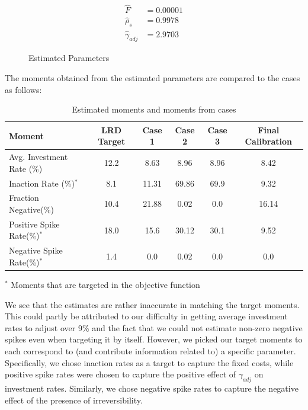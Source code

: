 \begin{figure}[H]
    \begin{align}
        \hat{F} &= 0.00001 \\
        \hat{\rho}_s &= 0.9978 \\
        \hat{\gamma}_{adj} &= 2.9703
    \end{align}
    \caption{Estimated Parameters}
\end{figure}
\noindent The moments obtained from the estimated parameters are compared to the cases as follows:
\begin{table}[H]
    \begin{tabular}{l c c c c c}
        
            \toprule
            Moment & LRD Target & Case 1 & Case 2 & Case 3 & Final Calibration \\
            \midrule
            Avg. Investment Rate (\%) & 12.2 & 8.63 & 8.96 & 8.96 & 8.42\\
            Inaction Rate (\%)$^*$ & 8.1 & 11.31 & 69.86 & 69.9 & 9.32 \\
            Fraction Negative(\%) & 10.4 & 21.88 & 0.02 & 0.0 & 16.14\\
            Positive Spike Rate(\%)$^*$ & 18.0 & 15.6 & 30.12 & 30.1 & 9.52 \\
            Negative Spike Rate(\%)$^*$ & 1.4 & 0.0 & 0.02 & 0.0 & 0.0 \\
            \bottomrule
    \end{tabular}

    {\noindent\RaggedRight\footnotesize $^*$ Moments that are targeted in the objective function}
    \caption{Estimated moments and moments from cases}
\end{table}

We see that the estimates are rather inaccurate in matching the target moments.
This could partly be attributed to our difficulty in getting average investment rates to adjust over 9\% and the fact that we could not estimate non-zero negative spikes even when targeting it by itself.
However, we picked our target moments to each correspond to (and contribute information related to) a specific parameter.
Specifically, we chose inaction rates as a target to capture the fixed costs, while positive spike rates were chosen to capture the positive effect of $\gamma_{adj}$ on investment rates.
Similarly, we chose negative spike rates to capture the negative effect of the presence of irreversibility. 